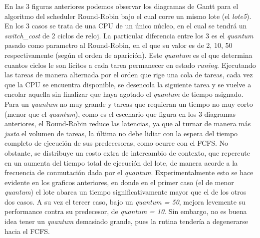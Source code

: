 En las 3 figuras anteriores podemos observar los diagramas de Gantt para el algoritmo del scheduler Round-Robin bajo el cual corre un mismo lote (el \textit{lote5}). En los 3 casos se trata de una CPU de un único núcleo, en el cual se tendrá un \textit{switch\_cost} de 2 ciclos de reloj. La particular diferencia entre los 3 es el \textit{quantum} pasado como parametro al Round-Robin, en el que su valor es de 2, 10, 50 respectivamente (según el orden de aparición). Este \textit{quantum} es el que determina cuantos ciclos le son lícitos a cada tarea permanecer en estado \textit{runing}. Ejecutando las tareas de manera alternada por el orden que rige una cola de tareas, cada vez que la CPU se encuentra disponible, se desencola la siguiente tarea y se vuelve a encolar aquella sin finalizar que haya agotado el \textit{quantum} de tiempo asignado. Para un \textit{quantum} no muy grande y tareas que requieran un tiempo no muy corto (menor que el \textit{quantum}), como es el escenario que figura en los 3 diagramas anteriores, el Round-Robin reduce las latencias, ya que al turnar de manera más \textit{justa} el volumen de tareas, la última no debe lidiar con la espera del tiempo completo de ejecución de sus predecesoras, como ocurre con el FCFS. No obstante, se distribuye un costo extra de intercambio de contexto, que repercute en un aumenta del tiempo total de ejecución del lote, de manera acorde a la frecuencia de conmutación dada por el \textit{quantum}. Experimentalmente esto se hace evidente en los graficos anteriores, en donde en el primer caso (el de menor \textit{quantum}) el lote abarca un tiempo significativamente mayor que el de los otros dos casos. A su vez el tercer caso, bajo un \textit{quantum = 50}, mejora levemente su performance contra su predecesor, de \textit{quantum = 10}. Sin embargo, no es buena idea tener un \textit{quantum} demasiado grande, pues la rutina tendería a degenerarse hacia el FCFS.